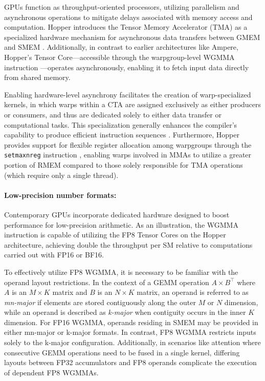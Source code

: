 GPUs function as throughput-oriented processors, utilizing parallelism and asynchronous operations to mitigate delays associated with memory access and computation. Hopper introduces the Tensor Memory Accelerator (TMA) as a specialized hardware mechanism for asynchronous data transfers between GMEM and SMEM \cite[\S7.29]{cuda}. Additionally, in contrast to earlier architectures like Ampere, Hopper’s Tensor Core—accessible through the warpgroup-level WGMMA instruction \cite[\S9.7.14]{ptx}—operates asynchronously, enabling it to fetch input data directly from shared memory.

Enabling hardware-level asynchrony facilitates the creation of warp-specialized kernels, in which warps within a CTA are assigned exclusively as either producers or consumers, and thus are dedicated solely to either data transfer or computational tasks. This specialization generally enhances the compiler's capability to produce efficient instruction sequences \citep{warp-specialization-2011}. Furthermore, Hopper provides support for flexible register allocation among warpgroups through the \verb|setmaxnreg| instruction \cite[\S9.7.17.1]{ptx}, enabling warps involved in MMAs to utilize a greater portion of RMEM compared to those solely responsible for TMA operations (which require only a single thread).

\paragraph{Low-precision number formats:}
\label{sec:low-precision-gpu}
Contemporary GPUs incorporate dedicated hardware designed to boost performance for low-precision arithmetic. As an illustration, the WGMMA instruction is capable of utilizing the FP8 Tensor Cores on the Hopper architecture, achieving double the throughput per SM relative to computations carried out with FP16 or BF16.

To effectively utilize FP8 WGMMA, it is necessary to be familiar with the operand layout restrictions. In the context of a GEMM operation $A \times B^{\top}$ where $A$ is an $M\times K$ matrix and $B$ is an $N\times K$ matrix, an operand is referred to as \emph{mn-major} if elements are stored contiguously along the outer $M$ or $N$ dimension, while an operand is described as \emph{k-major} when contiguity occurs in the inner $K$ dimension. For FP16 WGMMA, operands residing in SMEM may be provided in either mn-major or k-major formats. In contrast, FP8 WGMMA restricts inputs solely to the k-major configuration. Additionally, in scenarios like attention where consecutive GEMM operations need to be fused in a single kernel, differing layouts between FP32 accumulators and FP8 operands complicate the execution of dependent FP8 WGMMAs.


